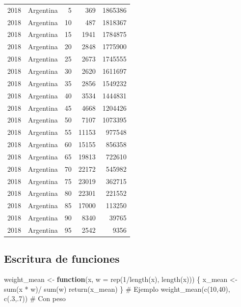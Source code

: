 \documentclass[
  letterpaper,
  DIV=11,
  numbers=noendperiod]{scrartcl}
\newenvironment{Shaded}{\begin{snugshade}}{\end{snugshade}}
\newcommand{\AttributeTok}[1]{\textcolor[rgb]{0.40,0.45,0.13}{#1}}
\newcommand{\CommentTok}[1]{\textcolor[rgb]{0.37,0.37,0.37}{#1}}
\newcommand{\ControlFlowTok}[1]{\textcolor[rgb]{0.00,0.23,0.31}{\textbf{#1}}}
\newcommand{\DecValTok}[1]{\textcolor[rgb]{0.68,0.00,0.00}{#1}}
\newcommand{\FunctionTok}[1]{\textcolor[rgb]{0.28,0.35,0.67}{#1}}
\newcommand{\NormalTok}[1]{\textcolor[rgb]{0.00,0.23,0.31}{#1}}
\newcommand{\OtherTok}[1]{\textcolor[rgb]{0.00,0.23,0.31}{#1}}
\newcommand{\SpecialCharTok}[1]{\textcolor[rgb]{0.37,0.37,0.37}{#1}}
\begin{document}
\begin{longtable}[]{@{}rlrrr@{}}
2018 & Argentina & 5 & 369 & 1865386 \\
2018 & Argentina & 10 & 487 & 1818367 \\
2018 & Argentina & 15 & 1941 & 1784875 \\
2018 & Argentina & 20 & 2848 & 1775900 \\
2018 & Argentina & 25 & 2673 & 1745555 \\
2018 & Argentina & 30 & 2620 & 1611697 \\
2018 & Argentina & 35 & 2856 & 1549232 \\
2018 & Argentina & 40 & 3534 & 1444831 \\
2018 & Argentina & 45 & 4668 & 1204426 \\
2018 & Argentina & 50 & 7107 & 1073395 \\
2018 & Argentina & 55 & 11153 & 977548 \\
2018 & Argentina & 60 & 15155 & 856358 \\
2018 & Argentina & 65 & 19813 & 722610 \\
2018 & Argentina & 70 & 22172 & 545982 \\
2018 & Argentina & 75 & 23019 & 362715 \\
2018 & Argentina & 80 & 22301 & 221552 \\
2018 & Argentina & 85 & 17000 & 113250 \\
2018 & Argentina & 90 & 8340 & 39765 \\
2018 & Argentina & 95 & 2542 & 9356 \\
\end{longtable}

\subsection{Escritura de funciones}\label{escritura-de-funciones}

\begin{Shaded}
\begin{Highlighting}[]
\NormalTok{weight\_mean }\OtherTok{\textless{}{-}} \ControlFlowTok{function}\NormalTok{(x, }\AttributeTok{w =} \FunctionTok{rep}\NormalTok{(}\DecValTok{1}\SpecialCharTok{/}\FunctionTok{length}\NormalTok{(x), }\FunctionTok{length}\NormalTok{(x))) \{}
\NormalTok{x\_mean }\OtherTok{\textless{}{-}} \FunctionTok{sum}\NormalTok{(x }\SpecialCharTok{*}\NormalTok{ w)}\SpecialCharTok{/} \FunctionTok{sum}\NormalTok{(w)}
\FunctionTok{return}\NormalTok{(x\_mean)}
\NormalTok{\}}
\CommentTok{\# Ejemplo}
\FunctionTok{weight\_mean}\NormalTok{(}\FunctionTok{c}\NormalTok{(}\DecValTok{10}\NormalTok{,}\DecValTok{40}\NormalTok{), }\FunctionTok{c}\NormalTok{(.}\DecValTok{3}\NormalTok{,.}\DecValTok{7}\NormalTok{)) }\CommentTok{\# Con peso}
\end{Highlighting}
\end{Shaded}
\end{document}

